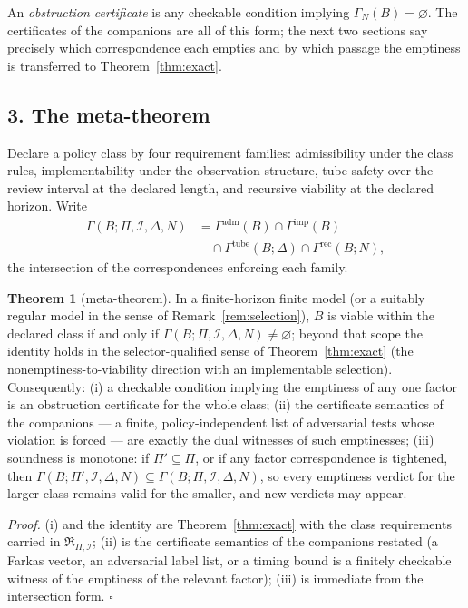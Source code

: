 \documentclass[10pt,twocolumn]{article}
\theoremstyle{definition}
\newtheorem{theorem}{Theorem}
\begin{document}
An \emph{obstruction certificate} is any checkable condition implying
\(\Gamma_{N}(B) = \varnothing\). The certificates of the companions are all
of this form; the next two sections say precisely which correspondence each
empties and by which passage the emptiness is transferred to
Theorem~\ref{thm:exact}.

\subsection{3. The meta-theorem}\label{meta}

Declare a policy class by four requirement families: admissibility under the
class rules, implementability under the observation structure, tube safety
over the review interval at the declared length, and recursive viability at
the declared horizon. Write
\begin{align*}
\Gamma(B; \Pi, \mathcal{I}, \Delta, N)
&= \Gamma^{\mathrm{adm}}(B) \cap \Gamma^{\mathrm{imp}}(B)\\
&\quad \cap \Gamma^{\mathrm{tube}}(B; \Delta) \cap \Gamma^{\mathrm{rec}}(B; N),
\end{align*}
the intersection of the correspondences enforcing each family.

\begin{theorem}[meta-theorem]\label{thm:meta}
In a finite-horizon finite model (or a suitably regular model in the
sense of Remark~\ref{rem:selection}), \(B\) is viable within the declared
class if and only if
\(\Gamma(B; \Pi, \mathcal{I}, \Delta, N) \neq \varnothing\); beyond that
scope the identity holds in the selector-qualified sense of
Theorem~\ref{thm:exact} (the nonemptiness-to-viability direction with an
implementable selection). Consequently:
(i) a checkable condition implying the emptiness of any one factor is an
obstruction certificate for the whole class;
(ii) the certificate semantics of the companions --- a finite,
policy-independent list of adversarial tests whose violation is forced ---
are exactly the dual witnesses of such emptinesses;
(iii) soundness is monotone: if \(\Pi' \subseteq \Pi\), or if any factor
correspondence is tightened, then
\(\Gamma(B; \Pi', \mathcal{I}, \Delta, N) \subseteq \Gamma(B; \Pi,
\mathcal{I}, \Delta, N)\), so every emptiness verdict for the larger class
remains valid for the smaller, and new verdicts may appear.
\end{theorem}

\emph{Proof.} (i) and the identity are Theorem~\ref{thm:exact} with the
class requirements carried in \(\mathfrak{R}_{\Pi,\mathcal{I}}\); (ii) is
the certificate semantics of the companions restated (a Farkas vector, an
adversarial label list, or a timing bound is a finitely checkable witness of
the emptiness of the relevant factor); (iii) is immediate from the
intersection form. \hfill\(\square\)
\end{document}

